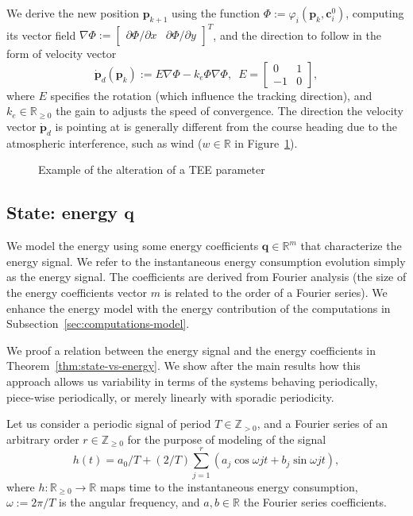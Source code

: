 \documentclass[letterpaper,10pt,conference]{ieeeconf}
\newcommand{\figpath}{./figures}
\theoremstyle{definition}
\begin{document}
We derive the new position $\mathbf{p}_{k+1}$ using the function $\varPhi:=\varphi_i(\mathbf{p}_k,\mathbf{c}_i^0)$, computing its vector field $\nabla\varPhi:=\begin{bmatrix}\partial\varPhi/\partial x & \partial\varPhi/\partial y\end{bmatrix}^T$, and the direction to follow in the form of velocity vector
\begin{equation}\label{eq:pd}
  \dot{\mathbf{p}}_d(\mathbf{p}_k):=E\nabla\varPhi-k_e\varPhi\nabla\varPhi,\,\,\,E=\begin{bmatrix}
    0&1\\-1&0
  \end{bmatrix},
\end{equation}
where $E$ specifies the rotation (which influence the tracking direction), and $k_e\in\mathbb{R}_{\geq 0}$ the gain to adjusts the speed of convergence. The direction the velocity vector $\dot{\mathbf{p}}_d$ is pointing at is generally different from the course heading due to the atmospheric interference, such as wind ($w\in\mathbb{R}$ in Figure~\ref{fig:overview}).

\begin{figure}[h]
  \centering
  
  \caption{Example of the alteration of a TEE parameter}
  \label{fig:overview}
\end{figure}

\subsection{State: energy $\mathbf{q}$}
\label{sec:energy-model}

We model the energy using some energy coefficients $\mathbf{q}\in\mathbb{R}^m$ that characterize the energy signal. We refer to the instantaneous energy consumption evolution simply as the energy signal. The coefficients are derived from Fourier analysis (the size of the energy coefficients vector $m$ is related to the order of a Fourier series). We enhance the energy model with the energy contribution of the computations in Subsection~\ref{sec:computations-model}. 

We proof a relation between the energy signal and the energy coefficients in Theorem~\ref{thm:state-vs-energy}. We show after the main results how this approach allows us variability in terms of the systems behaving periodically, piece-wise periodically, or merely linearly with sporadic periodicity.

Let us consider a periodic signal of period $T\in\mathbb{Z}_{> 0}$, and a Fourier series of an arbitrary order $r\in\mathbb{Z}_{\geq 0}$ for the purpose of modeling of the signal
\begin{equation}\label{eq:fourier}
  h(t)=a_0/T+(2/T)\sum_{j=1}^{r}{\left(a_j\cos{\omega jt}+b_j\sin{\omega jt}\right)},
\end{equation}
where $h:\mathbb{R}_{\geq 0}\rightarrow\mathbb{R}$ maps time to the instantaneous energy consumption, $\omega:=2\pi/T$ is the angular frequency, and $a,b\in\mathbb{R}$ the Fourier series coefficients.
\end{document}
